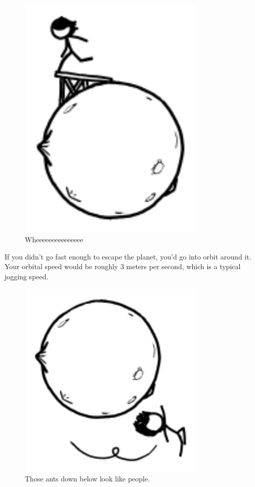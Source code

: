 {\begin{figure}[!htbp]
\centering
\includegraphics[scale=0.5, max width=0.8\textwidth]{imgs/a/68/asteroid_ramp.png}
\caption{Wheeeeeeeeeeeeeee}
\end{figure}

{If you didn't go fast enough to escape the planet, you'd go into orbit around it. Your orbital speed would be roughly 3 meters per second, which is a typical jogging speed.}

\begin{figure}[!htbp]
\centering
\includegraphics[scale=0.5, max width=0.8\textwidth]{imgs/a/68/asteroid_orbit.png}
\caption{Those ants down below look like people.}
\end{figure}

}
